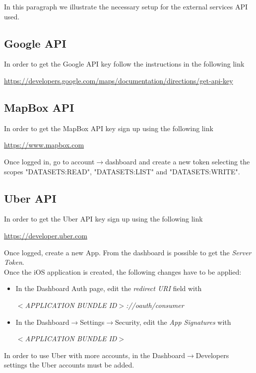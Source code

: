 In this paragraph we illustrate the necessary setup for the external services API used.

\subsection{Google API}
In order to get the Google API key follow the instructions in the following link
\begin{center}
	\hyperref{https://developers.google.com/maps/documentation/directions/get-api-key}{}{}{https://developers.google.com/maps/documentation/directions/get-api-key}
\end{center} 

\subsection{MapBox API}
In order to get the MapBox API key sign up using the following link
\begin{center}
	\hyperref{https://www.mapbox.com}{}{}{https://www.mapbox.com}
\end{center}
Once logged in, go to account$\rightarrow$dashboard and create a new token selecting the scopes "DATASETS:READ", "DATASETS:LIST" and "DATASETS:WRITE".

\subsection{Uber API}
In order to get the Uber API key sign up using the following link
\begin{center}
	\hyperref{https://developer.uber.com}{}{}{https://developer.uber.com}
\end{center}
Once logged, create a new App. From the dashboard is possible to get the \textit{Server Token}.\\
Once the iOS application is created, the following changes have to be applied:
\begin{itemize}
	\item In the Dashboard Auth page, edit the \textit{redirect URI} field with
	\begin{center}
		\textit{$<$APPLICATION BUNDLE ID$>$://oauth/consumer}
	\end{center} 
	\item In the Dashboard$\rightarrow$Settings$\rightarrow$Security, edit the \textit{App Signatures} with
	\begin{center}
		\textit{$<$APPLICATION BUNDLE ID$>$}
	\end{center}
\end{itemize}
In order to use Uber with more accounts, in the Dashboard$\rightarrow$Developers settings the Uber accounts must be added.

